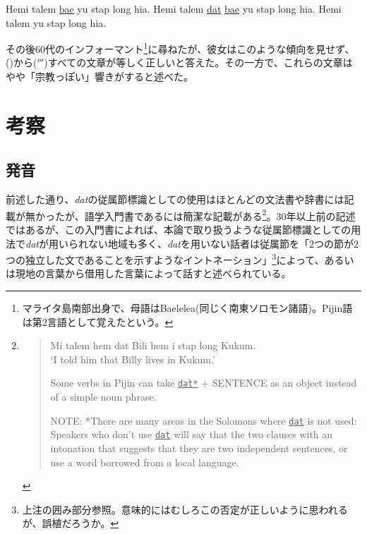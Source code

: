 \begin{exe}
 Hemi talem \underline{bae} yu stap long hia.
 Hemi talem \underline{dat} \underline{bae} yu stap long hia.
 Hemi talem yu stap long hia.
\end{exe}

その後60代のインフォーマント\footnote{マライタ島南部出身で、母語はBaelelea(同じく南東ソロモン諸語)。Pijin語は第2言語として覚えたという。}に尋ねたが、彼女はこのような傾向を見せず、()から($'''$)すべての文章が等しく正しいと答えた。その一方で、これらの文章はやや「宗教っぽい」響きがすると述べた。

\section{考察}
\subsection{発音}
前述した通り、\textit{dat}の従属節標識としての使用はほとんどの文法書や辞書には記載が無かったが、語学入門書である\cite{eric}には簡潔な記載がある\footnote{
\cite{eric}\vspace{0.1in}
\begin{quote}
\begin{exe}
   Mi talem hem dat Bili hem i stap long Kukum. \\
  `I told him that Billy lives in Kukum.'
\end{exe}\vspace{0.1in}
Some verbs in Pijin can take \underline{\texttt{dat*}} + SENTENCE as an object instead of a simple noun phrase.
\begin{screen}
NOTE: *There are many areas in the Solomons where \underline{\texttt{dat}} is not used: Speakers who don't use \underline{\texttt{dat}} will say that the two clauses with an intonation that suggests that they are two independent sentences, or use a word borrowed from a local language.
\end{screen}
\end{quote}
}。30年以上前の記述ではあるが、この入門書によれば、本論で取り扱うような従属節標識としての用法で\textit{dat}が用いられない地域も多く、\textit{dat}を用いない話者は従属節を「2つの節が2つの独立した文であることを示すようなイントネーション」\footnote{上注の囲み部分参照。意味的にはむしろこの否定が正しいように思われるが、誤植だろうか。}によって、あるいは現地の言葉から借用した言葉によって話すと述べられている。

